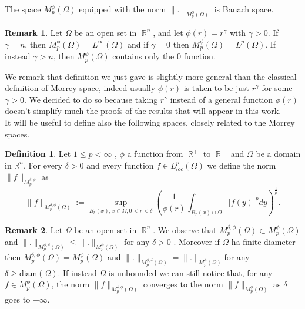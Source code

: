 \documentclass[12pt]{article}
\theoremstyle{definition}
\newtheorem{definition}{Definition}
\newtheorem{remark}{Remark}
\DeclareMathOperator\rr{\mathbb{R}}
\begin{document}
The space $M_p^\phi(\Omega)$ equipped with the norm $\|.\|_{M_p^\phi(\Omega)}$ is Banach space.
\begin{remark}
	Let $\Omega$ be an open set in $\rr^n$, and let $\phi(r)=r^\gamma$ with $\gamma>0.$ If $\gamma=n$, then $M_p^\phi(\Omega)=L^\infty(\Omega)$ and if $\gamma=0$ then $M_p^\phi(\Omega)=L^p(\Omega)$. If instead $\gamma>n$, then $M_p^\phi(\Omega)$ contains only the 0 function.
\end{remark}

We remark that definition we just gave is slightly more general than the classical definition of Morrey space, indeed usually $\phi(r)$ is taken to be just $r^\gamma$ for some $\gamma>0.$ We decided to do so because taking $r^\gamma$ instead of a general function $\phi(r)$ doesn't simplify much the proofs of the results that will appear in this work.\\
It will be useful to define also the following spaces, closely related to the Morrey spaces. 
\begin{definition}
Let $1\le p< \infty$ , $\phi$ a function from $\rr^+$ to $\rr^+$ and $\Omega$ be a domain in $\mathbb{R}^n$. For every $\delta>0$ and every function $f \in L^p_{loc}(\Omega)$ we define the norm $\|f\|_{M^{\delta,\phi}_p}$ as
\[\| f\|_{M^{\delta,\phi}_p(\Omega)} := \sup_{B_r(x), x \in \Omega, 0<r<\delta} \left(  \frac{1}{\phi(r)}\int_{B_r(x)\cap \Omega} |f(y)|^p dy \right )^{\frac{1}{p}}.\]
\end{definition}
\begin{remark}
	Let $\Omega$ be an open set in $\rr^n$. We observe that $M_p^{\delta,\phi}(\Omega)\subset M_p^\phi(\Omega) $ and $\|.\|_{M_p^{\phi,\delta}(\Omega)}\le\|.\|_{M_p^{\phi}(\Omega)}$ for any $\delta>0$ . Moreover if $\Omega$ ha finite diameter then $M_p^{\delta,\phi}(\Omega)= M_p^\phi(\Omega) $ and $\|.\|_{M_p^{\phi,\delta}(\Omega)}=\|.\|_{M_p^{\phi}(\Omega)}$for any $\delta\ge \text{diam}(\Omega).$ If instead $\Omega$ is unbounded we can still notice that, for any $f \in M_p^\phi(\Omega)$, the norm $\|f\|_{M_p^{\delta,\phi}(\Omega)}$ converges to the norm $\|f\|_{M_p^{\phi}(\Omega)}$ as $\delta$ goes to $+\infty.$ 
\end{remark}
\end{document}
